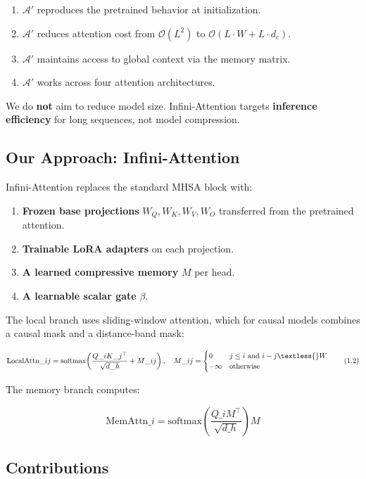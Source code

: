 \begin{enumerate}
\item $\mathcal{A}'$ reproduces the pretrained behavior at initialization.
\item $\mathcal{A}'$ reduces attention cost from $\mathcal{O}(L^2)$ to
  $\mathcal{O}(L \cdot W + L \cdot d_c)$.
\item $\mathcal{A}'$ maintains access to global context via the memory matrix.
\item $\mathcal{A}'$ works across four attention architectures.

\end{enumerate}
We do \textbf{not} aim to reduce model size. Infini-Attention targets 
\textbf{inference efficiency} for long sequences, not model compression.

\subsection{Our Approach: Infini-Attention}

Infini-Attention replaces the standard MHSA block with:

\begin{enumerate}
\item \textbf{Frozen base projections} $W_Q, W_K, W_V, W_O$ transferred from the
  pretrained attention.
\item \textbf{Trainable LoRA adapters} on each projection.
\item \textbf{A learned compressive memory} $M$ per head.
\item \textbf{A learnable scalar gate} $\beta$.

\end{enumerate}
The local branch uses sliding-window attention, which for causal models 
combines a causal mask and a distance-band mask:

\[
\text{LocalAttn}\_{ij} = \text{softmax}\!\left(\frac{Q\_i K\_j^\top}{\sqrt{d\_h}} + M\_{ij}\right), \quad
M\_{ij} = \begin{cases} 0 & j \leq i \text{ and } i - j \textless{} W \\ -\infty & \text{otherwise} \end{cases}
\tag{1.2}
\]

The memory branch computes:

\[
\text{MemAttn}\_i = \text{softmax}\!\left(\frac{Q\_i M^\top}{\sqrt{d\_h}}\right) M
\tag{1.3}
\]

\subsection{Contributions}

